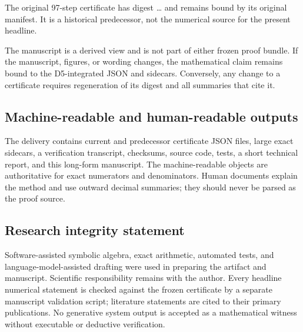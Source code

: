 The original 97-step certificate has digest
\ldots{} and remains bound by its
original manifest.  It is a historical predecessor, not the numerical source
for the present headline.

The manuscript is a derived view and is not part of either frozen proof bundle.
If the manuscript, figures, or wording changes, the mathematical claim remains
bound to the D5-integrated JSON and sidecars.  Conversely, any change to a
certificate requires regeneration of its digest and all summaries that cite
it.

\subsection{Machine-readable and human-readable outputs}

The delivery contains current and predecessor certificate JSON files, large
exact sidecars, a verification transcript, checksums, source code, tests, a
short technical report, and this long-form manuscript.  The
machine-readable objects are authoritative for exact numerators and
denominators.  Human documents explain the method and use outward decimal
summaries; they should never be parsed as the proof source.

\subsection{Research integrity statement}

Software-assisted symbolic algebra, exact arithmetic, automated tests, and
language-model-assisted drafting were used in preparing the artifact and
manuscript.  Scientific responsibility remains with the author.  Every
headline numerical statement is checked against the frozen certificate by a
separate manuscript validation script; literature statements are cited to
their primary publications.  No generative system output is accepted as a
mathematical witness without executable or deductive verification.
